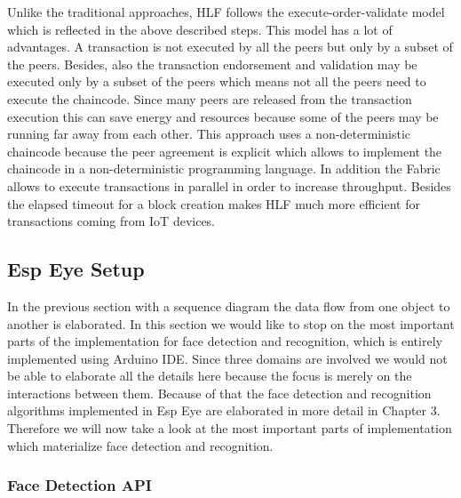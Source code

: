  Unlike the traditional approaches, HLF follows the execute-order-validate model which is reflected in the above described steps. This model has a lot of advantages. A transaction is not executed by all the peers but only by a subset of the peers. Besides, also the transaction endorsement and validation may be executed only by a subset of the peers which means not all the peers need to execute the chaincode. Since many peers are released from the transaction execution this can save energy and resources because some of the peers may be running far away from each other. 
 This approach uses a non-deterministic chaincode because the peer agreement is explicit  which allows to implement the chaincode in a non-deterministic programming language. In addition the Fabric allows to execute transactions in parallel in order to increase throughput. Besides the elapsed timeout for a block creation makes HLF much more efficient for transactions coming from IoT devices.
 
 
 
\subsection{Esp Eye Setup}

In the previous section with a sequence diagram the data flow from one object to another is elaborated. In this section we would like to stop on the most important parts of the implementation for face detection and recognition, which is entirely implemented using Arduino IDE. Since three domains are involved we would not be able to elaborate all the details here because the focus is merely on the interactions between them. Because of that the face detection and recognition algorithms implemented in Esp Eye are elaborated in more detail in Chapter 3. Therefore we will now take a look at the most important parts of implementation which materialize face detection and recognition.


\subsubsection{Face Detection API} 

